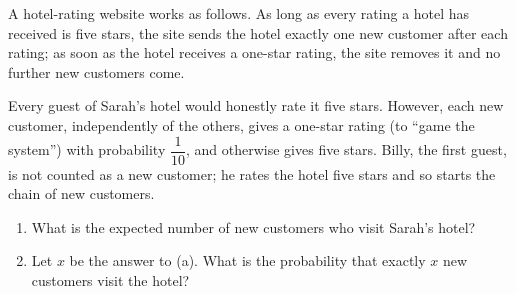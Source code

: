 A hotel-rating website works as follows. As long as every rating a hotel has received is five stars, the site sends the hotel exactly one new customer after each rating; as soon as the hotel receives a one-star rating, the site removes it and no further new customers come.

Every guest of Sarah's hotel would honestly rate it five stars. However, each new customer, independently of the others, gives a one-star rating (to ``game the system'') with probability $\dfrac{1}{10}$, and otherwise gives five stars. Billy, the first guest, is not counted as a new customer; he rates the hotel five stars and so starts the chain of new customers.
\begin{enumerate}
\item[(a)] What is the expected number of new customers who visit Sarah's hotel?
\item[(b)] Let $x$ be the answer to (a). What is the probability that exactly $x$ new customers visit the hotel?
\end{enumerate}
